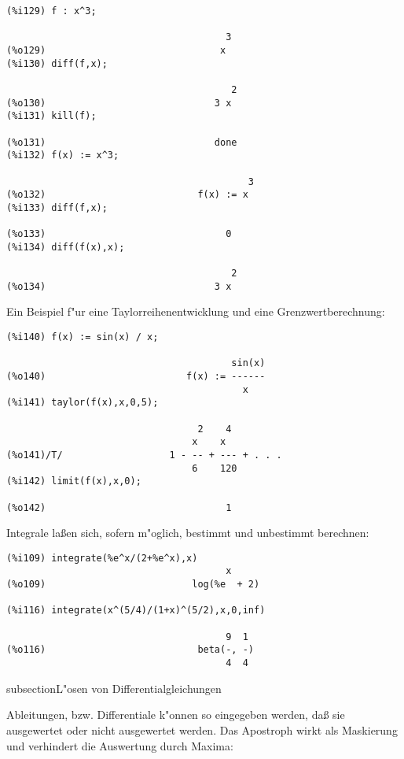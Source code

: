 \documentclass[spanish,12pt,a4paper]{article}
\begin{document}
\scriptsize
\begin{verbatim}
(%i129) f : x^3;

                                       3
(%o129)                               x
(%i130) diff(f,x);

                                        2
(%o130)                              3 x
(%i131) kill(f);

(%o131)                              done
(%i132) f(x) := x^3;

                                           3
(%o132)                           f(x) := x
(%i133) diff(f,x);

(%o133)                                0
(%i134) diff(f(x),x);

                                        2
(%o134)                              3 x
\end{verbatim}
\normalsize

Ein Beispiel f"ur eine Taylorreihenentwicklung und eine Grenzwertberechnung:

\scriptsize
\begin{verbatim}
(%i140) f(x) := sin(x) / x;

                                        sin(x)
(%o140)                         f(x) := ------
                                          x
(%i141) taylor(f(x),x,0,5);

                                  2    4
                                 x    x
(%o141)/T/                   1 - -- + --- + . . .
                                 6    120
(%i142) limit(f(x),x,0);

(%o142)                                1
\end{verbatim}
\normalsize

Integrale la{\ss}en sich, sofern m"oglich, bestimmt und unbestimmt berechnen:

\scriptsize
\begin{verbatim}
(%i109) integrate(%e^x/(2+%e^x),x)
                                       x
(%o109)                          log(%e  + 2)

(%i116) integrate(x^(5/4)/(1+x)^(5/2),x,0,inf)

                                       9  1
(%o116)                           beta(-, -)
                                       4  4
\end{verbatim}
\normalsize


subsection{L"osen von Differentialgleichungen}

Ableitungen, bzw. Differentiale k"onnen so eingegeben werden, da{\ss} sie ausgewertet oder nicht ausgewertet werden. Das Apostroph wirkt als Maskierung und verhindert die Auswertung durch Maxima:
\end{document}
